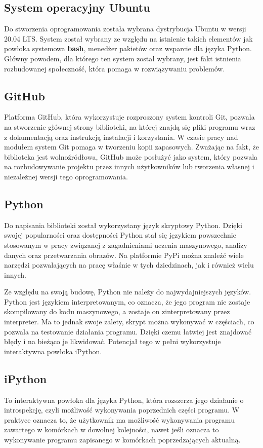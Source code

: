 \subsection{System operacyjny Ubuntu}
\quad Do stworzenia oprogramowania została wybrana dystrybucja Ubuntu w wersji 20.04 LTS. System został wybrany ze względu na istnienie takich elementów jak powłoka systemowa \textbf{bash}, menedżer pakietów oraz wsparcie dla języka Python. Główny powodem, dla którego ten system został wybrany, jest fakt istnienia rozbudowanej społeczność, która pomaga w rozwiązywaniu problemów. 

\subsection{GitHub}
\quad Platforma GitHub, która wykorzystuje rozproszony system kontroli Git, pozwala na stworzenie głównej strony biblioteki, na której znajdą się pliki programu wraz z dokumentacją oraz instrukcją instalacji i korzystania. W czasie pracy nad modułem system Git pomaga w tworzeniu kopii zapasowych. Zważając na fakt, że biblioteka jest wolnoźródłowa, GitHub może posłużyć jako system, który pozwala na rozbudowywanie projektu przez innych użytkowników lub tworzenia własnej i niezależnej wersji tego oprogramowania. 

\subsection{Python}
\quad Do napisania biblioteki został wykorzystany język skryptowy Python. Dzięki swojej popularności oraz dostępności Python stał się językiem powszechnie stosowanym w pracy związanej z zagadnieniami uczenia maszynowego, analizy danych oraz przetwarzania obrazów. Na platformie PyPi można znaleźć wiele narzędzi pozwalających na pracę właśnie w tych dziedzinach, jak i również wielu innych. 

\quad Ze względu na swoją budowę, Python nie należy do najwydajniejszych języków. Python jest językiem interpretowanym, co oznacza, że jego program nie zostaje skompilowany do kodu maszynowego, a zostaje on zinterpretowany przez interpreter. Ma to jednak swoje zalety, skrypt można wykonywać w częściach, co pozwala na testowanie działania programu. Dzięki czemu łatwiej jest znajdować błędy i na bieżąco je likwidować. Potencjał tego w pełni wykorzystuje interaktywna powłoka iPython. 

\subsection{iPython}
\quad To interaktywna powłoka dla języka Python, która rozszerza jego działanie o introspekcję, czyli możliwość wykonywania poprzednich części programu. W praktyce oznacza to, że użytkownik ma możliwość wykonywania programu zawartego w komórkach w dowolnej kolejności, nawet jeśli oznacza to wykonywanie programu zapisanego w komórkach poprzedzających aktualną. 


